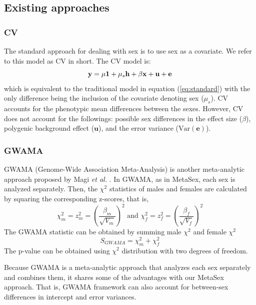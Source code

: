 \documentclass[11pt]{article}
\newcommand{\var}[1]{\mathrm{Var}\left( #1 \right)}
\begin{document}
\subsection{Existing approaches}

\subsubsection*{CV}

The standard approach for dealing with sex is to use sex as a covariate.
We refer to this model as CV in short. 
The CV model is: 
\[ {\bf y} = \mu {\bf 1} + \mu_s {\bf h} + \beta {\bf x} + {\bf u} + {\bf e} \]
which is equivalent to the traditional model in equation (\ref{eq:standard})
with the only difference being the inclusion of the covariate denoting sex ($\mu_s$).
CV accounts for the phenotypic mean differences between the sexes.
However, CV does not account for the followings:
possible sex differences in the effect size ($\beta$), 
polygenic background effect ($\mathbf{u}$),
and the error variance ($\var{\mathbf{e}}$).

\subsubsection*{GWAMA}

GWAMA (Genome-Wide Association Meta-Analysis) is another meta-analytic approach proposed by Magi \textit{et al.}
\citep{Magi:GenetEpidemiol:2010}.
In GWAMA, as in MetaSex, each sex is analyzed separately. 
Then, the $\chi^2$ statistics of males and females are calculated
by squaring the corresponding z-scores, that is, 
\[\chi^2_m = z_m^2 = ( \frac{\beta_m}{\sqrt{V_m}} )^2  \mbox{  and  } \chi^2_f = z_f^2 = ( \frac{\beta_f}{\sqrt{V_f}} )^2\]
The GWAMA statistic can be obtained by summing male $\chi^2$ and female $\chi^2$
\[S_{GWAMA} = \chi^2_m + \chi^2_f\]
The p-value can be obtained using
$\chi^2$ distribution with two degrees of freedom.  

Because GWAMA is a meta-analytic approach that analyzes each sex separately and combines them,
it shares some of the advantages with our MetaSex approach.
That is, GWAMA framework can also account for 
between-sex differences
in intercept and error variances.
\end{document}
